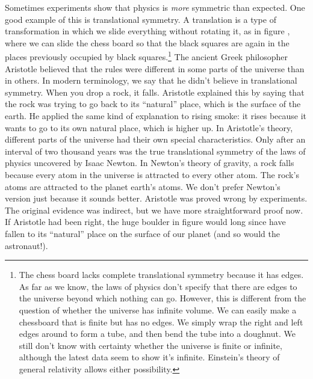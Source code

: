 Sometimes experiments show that physics is \emph{more} symmetric than expected. One good
example of this is translational symmetry. A translation is a type of transformation
in which we slide everything without rotating it, as in figure ,
where we can slide the chess board so that the black squares are again in the places previously
occupied by black squares.\footnote{The chess board lacks complete translational symmetry
because it has edges. As far as we know, the laws of physics don't specify that there are
edges to the universe beyond which nothing can go. However, this is different from the
question of whether the universe has infinite volume. We can easily make a chessboard that
is finite but has no edges. We simply wrap the right and left edges around to form a tube,
and then bend the tube into a doughnut. We still don't know with certainty whether the
universe is finite or infinite, although the latest data seem to show it's infinite.
Einstein's theory of general relativity allows either possibility.}
The ancient Greek philosopher Aristotle believed that the rules were different in some
parts of the universe than in others. In modern terminology, we say that he didn't
believe in translational symmetry. When you drop a rock, it falls. Aristotle explained
this by saying that the rock was trying to go back to its ``natural'' place, which is
the surface of the earth. He applied the same kind of explanation to rising smoke: it rises
because it wants to go to its own natural place, which is higher up. In Aristotle's
theory, different parts of the universe had their own special characteristics.
Only after an interval of two thousand years was the true translational symmetry of
the laws of physics uncovered by Isaac Newton. In Newton's theory of gravity,
a rock falls because every atom in the universe is attracted to every other atom.
The rock's atoms are attracted to the planet earth's atoms. We don't prefer Newton's
version just because it sounds better. Aristotle was proved wrong by
experiments. The original evidence was indirect, but we have more straightforward
proof now. If Aristotle had been right, the huge boulder in figure 
would long since have fallen to its ``natural'' place on the surface of our planet
(and so would the astronaut!).\label{space-translation-symmetry}

